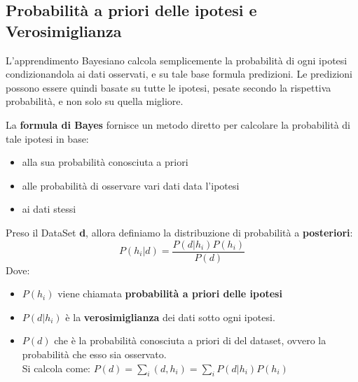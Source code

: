 \subsection{Probabilità a priori delle ipotesi e Verosimiglianza}
\begin{definizione}
L'apprendimento Bayesiano calcola semplicemente la probabilità di ogni ipotesi condizionandola ai dati osservati,  e su tale base formula predizioni. Le predizioni possono essere quindi basate su tutte le ipotesi, pesate secondo la rispettiva probabilità, e non solo su quella migliore.
\end{definizione}
La \textbf{formula di Bayes} fornisce un metodo diretto per calcolare la probabilità di tale ipotesi in base:
\begin{itemize}
  \item alla sua probabilità conosciuta a priori
  \item alle probabilità di osservare vari dati data l'ipotesi
  \item ai dati stessi
\end{itemize}
\begin{definizione}
  Preso il DataSet \textbf{d}, allora definiamo la distribuzione di probabilità a \textbf{posteriori}:
  \[P(h_i|d)=\frac{P(d|h_i)P(h_i)}{P(d)}\]
  Dove:
  \begin{itemize}
        \item $P(h_i)$ viene chiamata \textbf{probabilità a priori delle ipotesi}
        \item $P(d|h_i)$ è la \textbf{verosimiglianza} dei dati sotto ogni ipotesi.
        \item $P(d)$ che è la probabilità conosciuta a priori di del dataset, ovvero la
     probabilità che esso sia osservato.\\ Si calcola come: $P(d)=\sum_i(d, h_i)=\sum_i P(d|h_i)P(h_i)$
    \end{itemize}
\end{definizione}
